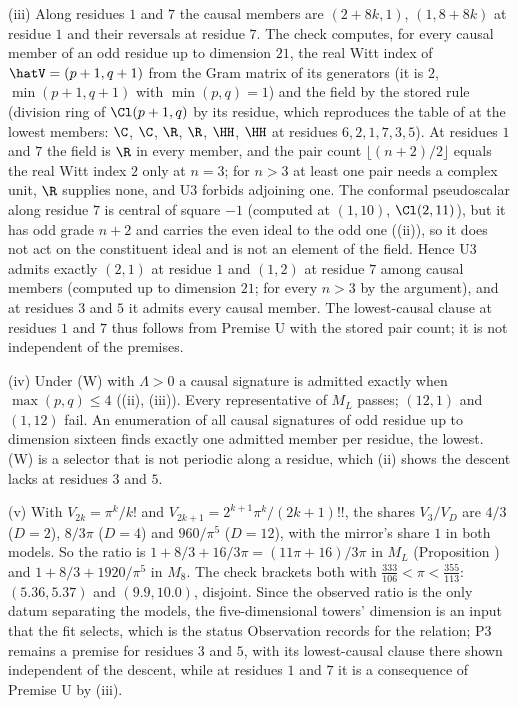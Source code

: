 (iii) Along residues $1$ and $7$ the causal members are $(2 + 8k, 1)$, $(1, 8 + 8k)$ at residue $1$ and their reversals at residue $7$. The check computes, for every causal member of an odd residue up to dimension $21$, the real Witt index of $\hatV = (p+1, q+1)$ from the Gram matrix of its generators (it is $2$, $\min(p+1, q+1)$ with $\min(p,q) = 1$) and the field by the stored rule (division ring of $\Cl(p+1, q)$ by its residue, which reproduces the table of  at the lowest members: $\C$, $\C$, $\R$, $\R$, $\HH$, $\HH$ at residues $6, 2, 1, 7, 3, 5$). At residues $1$ and $7$ the field is $\R$ in every member, and the pair count $\lfloor(n+2)/2\rfloor$ equals the real Witt index $2$ only at $n = 3$; for $n > 3$ at least one pair needs a complex unit, $\R$ supplies none, and U3 forbids adjoining one. The conformal pseudoscalar along residue $7$ is central of square $-1$ (computed at $(1,10)$, $\Cl(2,11)$), but it has odd grade $n + 2$ and carries the even ideal to the odd one ((ii)), so it does not act on the constituent ideal and is not an element of the field. Hence U3 admits exactly $(2,1)$ at residue $1$ and $(1,2)$ at residue $7$ among causal members (computed up to dimension $21$; for every $n > 3$ by the argument), and at residues $3$ and $5$ it admits every causal member. The lowest-causal clause at residues $1$ and $7$ thus follows from Premise U with the stored pair count; it is not independent of the premises.

(iv) Under (W) with $\Lambda > 0$ a causal signature is admitted exactly when $\max(p,q) \le 4$ ((ii), (iii)). Every representative of $M_{L}$ passes; $(12,1)$ and $(1,12)$ fail. An enumeration of all causal signatures of odd residue up to dimension sixteen finds exactly one admitted member per residue, the lowest. (W) is a selector that is not periodic along a residue, which (ii) shows the descent lacks at residues $3$ and $5$.

(v) With $V_{2k} = \pi^{k}/k!$ and $V_{2k+1} = 2^{k+1}\pi^{k}/(2k+1)!!$, the shares $V_{3}/V_{D}$ are $4/3$ ($D = 2$), $8/3\pi$ ($D = 4$) and $960/\pi^{5}$ ($D = 12$), with the mirror's share $1$ in both models. So the ratio is $1 + 8/3 + 16/3\pi = (11\pi + 16)/3\pi$ in $M_{L}$ (Proposition ) and $1 + 8/3 + 1920/\pi^{5}$ in $M_{8}$. The check brackets both with $\tfrac{333}{106} < \pi < \tfrac{355}{113}$: $(5.36, 5.37)$ and $(9.9, 10.0)$, disjoint. Since the observed ratio is the only datum separating the models, the five-dimensional towers' dimension is an input that the fit selects, which is the status Observation  records for the relation; P3 remains a premise for residues $3$ and $5$, with its lowest-causal clause there shown independent of the descent, while at residues $1$ and $7$ it is a consequence of Premise U by (iii).
